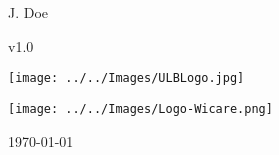 \vspace{1cm}

\begin{flushright}
	\begin{Large}
		J. {\sc Doe}\\
	\end{Large}
	v1.0
\end{flushright}

\vfill
\begin{minipage}{0.47\textwidth}
	\begin{flushleft}
\texttt{[image: ../../Images/ULBLogo.jpg]}
	\end{flushleft}
\end{minipage}
\hfill
\begin{minipage}{0.47\textwidth}
	\begin{flushright}
\texttt{[image: ../../Images/Logo-Wicare.png]}
	\end{flushright}
\end{minipage}
\vspace{1cm}
\begin{center}
	\begin{Large}
		\today
	\end{Large}
\end{center}


\endgroup
